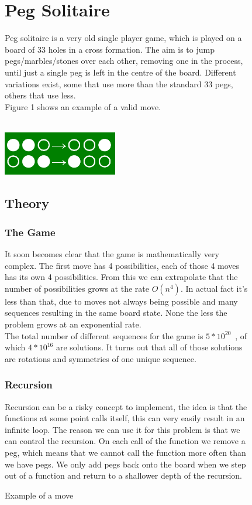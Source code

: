 \documentclass[11pt]{article}
\begin{document}
\begin{figure}
\section{Peg Solitaire}
Peg solitaire is a very old single player game, which is played on a board of 33 holes in a cross formation. The aim is to jump pegs/marbles/stones over each other, removing one in the process, until just a single peg is left in the centre of the board. Different variations exist, some that use more than the standard 33 pegs, others that use less.\\
Figure 1 shows an example of a valid move.\\\\
\begin{center}
\includegraphics[width=5cm]{1}
\end{center}
\caption{Example of a move} 
\label{fig: 1}
\subsection{Theory}
\subsubsection*{The Game}
It soon becomes clear that the game is mathematically very complex. The first move has 4 possibilities, each of those 4 moves has its own 4 possibilities. From this we can extrapolate that the number of possibilities grows at the rate $O(n^4)$. In actual fact it's less than that, due to moves not always being possible and many sequences resulting in the same board state. None the less the problem grows at an exponential rate.\\
The total number of different sequences for the game is $5*10^{20}$~\cite{durango}, of which $4*10^{16}$ are solutions.
It turns out that all of those solutions are rotations and symmetries of one unique sequence. 

\subsubsection*{Recursion}
Recursion can be a risky concept to implement, the idea is that the functions at some point calls itself, this can very easily result in an infinite loop. The reason we can use it for this problem is that we can control the recursion. On each call of the function we remove a peg, which means that we cannot call the function more often than we have pegs. We only add pegs back onto the board when we step out of a function and return to a shallower depth of the recursion.
\end{figure}
\end{document}
